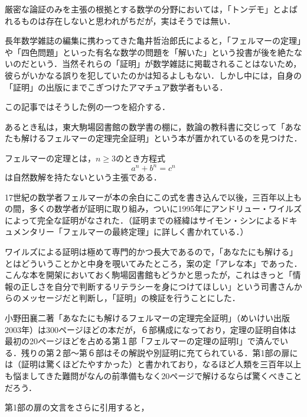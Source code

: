 
厳密な論証のみを主張の根拠とする数学の分野においては，「トンデモ」とよばれるものは存在しないと思われがちだが，実はそうでは無い．

長年数学雑誌の編集に携わってきた亀井哲治郎氏によると，「フェルマーの定理」や「四色問題」といった有名な数学の問題を「解いた」という投書が後を絶たないのだという．当然それらの「証明」が数学雑誌に掲載されることはないため，彼らがいかなる誤りを犯していたのかは知るよしもない．しかし中には，自身の「証明」の出版にまでこぎつけたアマチュア数学者もいる．

この記事ではそうした例の一つを紹介する．

あるとき私は，東大駒場図書館の数学書の棚に，数論の教科書に交じって「あなたも解けるフェルマーの定理完全証明」という本が置かれているのを見つけた．

フェルマーの定理とは，$n\geq 3$のとき方程式
\[a^n+b^n=c^n\]
は自然数解を持たないという主張である．

17世紀の数学者フェルマーが本の余白にこの式を書き込んで以後，三百年以上もの間，多くの数学者が証明に取り組み，ついに1995年にアンドリュー・ワイルズによって完全な証明がなされた．（証明までの経緯はサイモン・シンによるドキュメンタリー「フェルマーの最終定理」に詳しく書かれている．）

ワイルズによる証明は極めて専門的かつ長大であるので，「あなたにも解ける」とはどういうことかと中身を覗いてみたところ，案の定「アレな本」であった．こんな本を開架においておく駒場図書館もどうかと思ったが，これはきっと「情報の正しさを自分で判断するリテラシーを身につけてほしい」という司書さんからのメッセージだと判断し，「証明」の検証を行うことにした．


小野田襄二著「あなたにも解けるフェルマーの定理完全証明」（めいけい出版　2003年）は300ページほどの本だが，６部構成になっており，定理の証明自体は最初の20ページほどを占める第１部「フェルマーの定理の証明I」で済んでいる．残りの第２部～第６部はその解説や別証明に充てられている．第1部の扉には（証明は驚くほどたやすかった）と書かれており，なるほど人類を三百年以上も悩ましてきた難問がなんの前準備もなく20ページで解けるならば驚くべきことだろう．

第1部の扉の文言をさらに引用すると，

